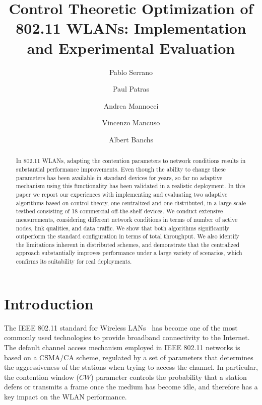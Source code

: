 \documentclass[a4paper,10pt]{article}
\newcommand{\revs}[1]{\textcolor{black}{#1}}
\begin{document}
\title{Control Theoretic Optimization of 802.11 WLANs: Implementation and Experimental Evaluation}

\author[1]{Pablo Serrano}
\author[2]{Paul Patras}
\author[3,1]{Andrea Mannocci}
\author[3,1]{Vincenzo Mancuso}
\author[1,3]{Albert Banchs}


\date{}

\maketitle

\begin{abstract}
In 802.11 WLANs, adapting the contention parameters to network conditions results in substantial performance improvements. Even though the ability to change these parameters has been available in standard devices for years, so far no adaptive mechanism using this functionality has been validated in a realistic deployment. In this paper we report our experiences with implementing and evaluating two adaptive algorithms based on control theory, one centralized and one distributed, in a large-scale testbed consisting of 18 commercial off-the-shelf devices. We conduct extensive measurements, considering different network conditions in terms of number of active nodes, link \revs{qualities, and data traffic}. We show that both algorithms significantly outperform the standard configuration in terms of total throughput. We also identify the limitations inherent in distributed schemes, and demonstrate that the centralized approach substantially improves performance under a large variety of scenarios, which confirms its suitability for real deployments.
\end{abstract}


\section{Introduction}
The IEEE 802.11 standard for Wireless LANs~\cite{80211revised} has become one of the most commonly used technologies to provide broadband connectivity to the Internet. The default channel access mechanism employed in IEEE 802.11 networks is based on a CSMA/CA scheme, regulated by a set of parameters that determines the aggressiveness of the stations when trying to access the channel. In particular, the contention window ($CW$) parameter controls the probability that a station defers or transmits a frame once the medium has become idle, and therefore has a key impact on the WLAN performance. 
\end{document}
